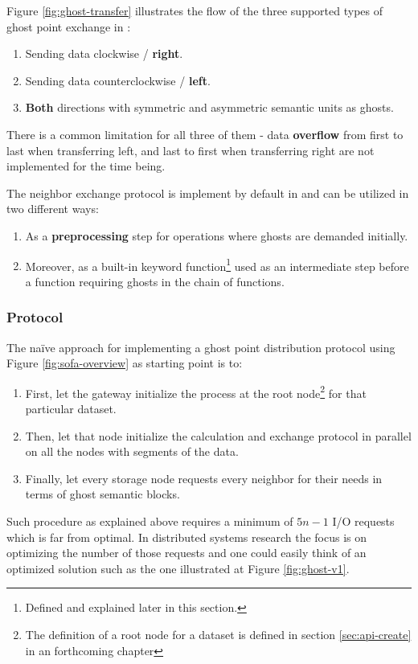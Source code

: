 Figure \ref{fig:ghost-transfer} illustrates the flow of the three supported types of ghost point exchange in \CodeName:

\begin{enumerate}
	\item Sending data clockwise / \textbf{right}.
	\item Sending data counterclockwise / \textbf{left}.
	\item \textbf{Both} directions with symmetric and asymmetric semantic units as ghosts.
\end{enumerate}
\vspace*{2mm}
There is a common limitation for all three of them - data \textbf{overflow} from first to last when transferring left, and last to first when transferring right are not implemented for the time being.
\newline

The neighbor exchange protocol is implement by default in \CodeName and can be utilized in two different ways:

\begin{enumerate}
	\item As a \textbf{preprocessing} step for operations where ghosts are demanded initially.
	\item Moreover, as a built-in keyword function\footnote{Defined and explained later in this section.} used as an intermediate step before a function requiring ghosts in the chain of functions.
\end{enumerate}

\subsubsection*{Protocol}
The naïve approach for implementing a ghost point distribution protocol using Figure \ref{fig:sofa-overview} as starting point is to:
\begin{enumerate}
	\item First, let the gateway initialize the process at the root node\footnote{The definition of a root node for a dataset is defined in section \ref{sec:api-create} in an forthcoming chapter} for that particular dataset.
	\item Then, let that node initialize the calculation and exchange protocol in parallel on all the nodes with segments of the data.
	\item Finally, let every storage node requests every neighbor for their needs in terms of ghost semantic blocks.
\end{enumerate}
\vspace*{2mm}
Such procedure as explained above requires a minimum of $5n-1$ I/O requests which is far from optimal. In distributed systems research the focus is on optimizing the number of those requests and one could easily think of an optimized solution such as the one illustrated at Figure \ref{fig:ghost-v1}. 

